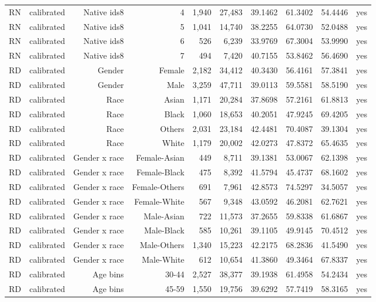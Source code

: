 \documentclass[10pt]{article}
\begin{document}
\begin{longtable}{@{}lrrrrrrrrr@{}}
RN & calibrated & Native ids8 & 4 & 1,940 & 27,483 & 39.1462 & 61.3402 & 54.4446 & yes \\
RN & calibrated & Native ids8 & 5 & 1,041 & 14,740 & 38.2255 & 64.0730 & 52.0488 & yes \\
RN & calibrated & Native ids8 & 6 & 526 & 6,239 & 33.9769 & 67.3004 & 53.9990 & yes \\
RN & calibrated & Native ids8 & 7 & 494 & 7,420 & 40.7155 & 53.8462 & 56.4690 & yes \\
RD & calibrated & Gender & Female & 2,182 & 34,412 & 40.3430 & 56.4161 & 57.3841 & yes \\
RD & calibrated & Gender & Male & 3,259 & 47,711 & 39.0113 & 59.5581 & 58.5190 & yes \\
RD & calibrated & Race & Asian & 1,171 & 20,284 & 37.8698 & 57.2161 & 61.8813 & yes \\
RD & calibrated & Race & Black & 1,060 & 18,653 & 40.2051 & 47.9245 & 69.4205 & yes \\
RD & calibrated & Race & Others & 2,031 & 23,184 & 42.4481 & 70.4087 & 39.1304 & yes \\
RD & calibrated & Race & White & 1,179 & 20,002 & 42.0273 & 47.8372 & 65.4635 & yes \\
RD & calibrated & Gender x race & Female-Asian & 449 & 8,711 & 39.1381 & 53.0067 & 62.1398 & yes \\
RD & calibrated & Gender x race & Female-Black & 475 & 8,392 & 41.5794 & 45.4737 & 68.1602 & yes \\
RD & calibrated & Gender x race & Female-Others & 691 & 7,961 & 42.8573 & 74.5297 & 34.5057 & yes \\
RD & calibrated & Gender x race & Female-White & 567 & 9,348 & 43.0592 & 46.2081 & 62.7621 & yes \\
RD & calibrated & Gender x race & Male-Asian & 722 & 11,573 & 37.2655 & 59.8338 & 61.6867 & yes \\
RD & calibrated & Gender x race & Male-Black & 585 & 10,261 & 39.1105 & 49.9145 & 70.4512 & yes \\
RD & calibrated & Gender x race & Male-Others & 1,340 & 15,223 & 42.2175 & 68.2836 & 41.5490 & yes \\
RD & calibrated & Gender x race & Male-White & 612 & 10,654 & 41.3860 & 49.3464 & 67.8337 & yes \\
RD & calibrated & Age bins & 30-44 & 2,527 & 38,377 & 39.1938 & 61.4958 & 54.2434 & yes \\
RD & calibrated & Age bins & 45-59 & 1,550 & 19,756 & 39.6292 & 57.7419 & 58.3165 & yes \\

\end{longtable}
\end{document}
